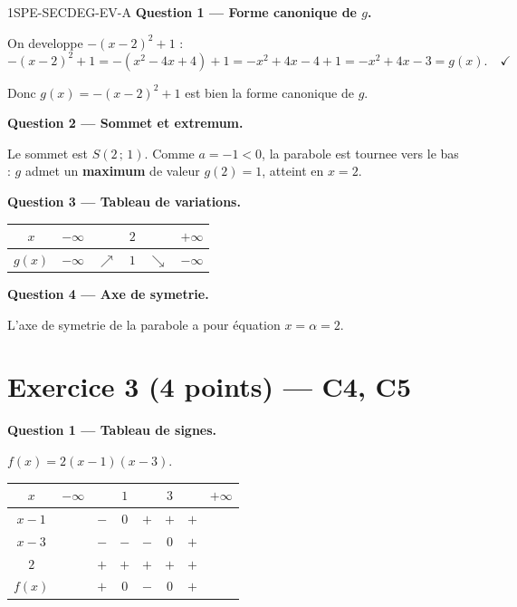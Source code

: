 \begin{corrige}{1SPE-SECDEG-EV-A}
\bigskip
\textbf{Question 1 — Forme canonique de $g$.}


On developpe $-(x-2)^2 + 1$ :
\[
-(x-2)^2 + 1 = -(x^2 - 4x + 4) + 1 = -x^2 + 4x - 4 + 1 = -x^2 + 4x - 3 = g(x). \quad \checkmark
\]

Donc $g(x) = -(x-2)^2 + 1$ est bien la forme canonique de $g$.

\medskip
\textbf{Question 2 — Sommet et extremum.}


Le sommet est $S(2\,;\,1)$. Comme $a = -1 < 0$, la parabole est tournee vers le bas : $g$ admet un \textbf{maximum} de valeur $g(2) = 1$, atteint en $x = 2$.

\medskip
\textbf{Question 3 — Tableau de variations.}

\begin{center}
\begin{tabular}{|c|ccccc|}
\hline
$x$ & $-\infty$ & & $2$ & & $+\infty$ \\
\hline
$g(x)$ & $-\infty$ & $\nearrow$ & $1$ & $\searrow$ & $-\infty$ \\
\hline
\end{tabular}
\end{center}

\medskip
\textbf{Question 4 — Axe de symetrie.}

L'axe de symetrie de la parabole a pour équation $x = \alpha = 2$.

\section*{Exercice 3 \hfill (4 points) — C4, C5}


\bigskip
\textbf{Question 1 — Tableau de signes.}


$f(x) = 2(x-1)(x-3)$.

\begin{center}
\begin{tabular}{|c|ccccccc|}
\hline
$x$ & $-\infty$ & & $1$ & & $3$ & & $+\infty$ \\
\hline
$x - 1$ & & $-$ & $0$ & $+$ & $+$ & $+$ & \\
$x - 3$ & & $-$ & $-$ & $-$ & $0$ & $+$ & \\
$2$ & & $+$ & $+$ & $+$ & $+$ & $+$ & \\
\hline
$f(x)$ & & $+$ & $0$ & $-$ & $0$ & $+$ & \\
\hline
\end{tabular}
\end{center}


\end{corrige}

